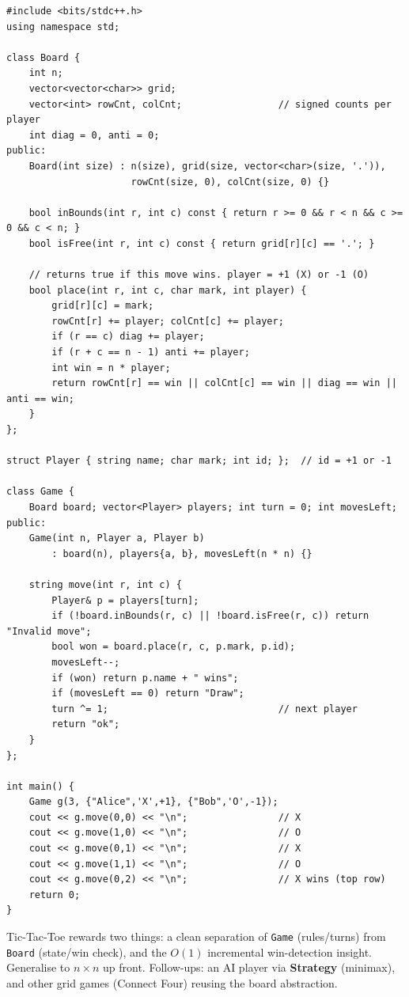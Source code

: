 \begin{lstlisting}
#include <bits/stdc++.h>
using namespace std;

class Board {
    int n;
    vector<vector<char>> grid;
    vector<int> rowCnt, colCnt;                 // signed counts per player
    int diag = 0, anti = 0;
public:
    Board(int size) : n(size), grid(size, vector<char>(size, '.')),
                      rowCnt(size, 0), colCnt(size, 0) {}

    bool inBounds(int r, int c) const { return r >= 0 && r < n && c >= 0 && c < n; }
    bool isFree(int r, int c) const { return grid[r][c] == '.'; }

    // returns true if this move wins. player = +1 (X) or -1 (O)
    bool place(int r, int c, char mark, int player) {
        grid[r][c] = mark;
        rowCnt[r] += player; colCnt[c] += player;
        if (r == c) diag += player;
        if (r + c == n - 1) anti += player;
        int win = n * player;
        return rowCnt[r] == win || colCnt[c] == win || diag == win || anti == win;
    }
};

struct Player { string name; char mark; int id; };  // id = +1 or -1

class Game {
    Board board; vector<Player> players; int turn = 0; int movesLeft;
public:
    Game(int n, Player a, Player b)
        : board(n), players{a, b}, movesLeft(n * n) {}

    string move(int r, int c) {
        Player& p = players[turn];
        if (!board.inBounds(r, c) || !board.isFree(r, c)) return "Invalid move";
        bool won = board.place(r, c, p.mark, p.id);
        movesLeft--;
        if (won) return p.name + " wins";
        if (movesLeft == 0) return "Draw";
        turn ^= 1;                              // next player
        return "ok";
    }
};

int main() {
    Game g(3, {"Alice",'X',+1}, {"Bob",'O',-1});
    cout << g.move(0,0) << "\n";                // X
    cout << g.move(1,0) << "\n";                // O
    cout << g.move(0,1) << "\n";                // X
    cout << g.move(1,1) << "\n";                // O
    cout << g.move(0,2) << "\n";                // X wins (top row)
    return 0;
}
\end{lstlisting}

\begin{takeawaybox}
Tic-Tac-Toe rewards two things: a clean separation of \texttt{Game}
(rules/turns) from \texttt{Board} (state/win check), and the $O(1)$
incremental win-detection insight. Generalise to $n\times n$ up front.
Follow-ups: an AI player via \textbf{Strategy} (minimax), and other grid
games (Connect Four) reusing the board abstraction.
\end{takeawaybox}
